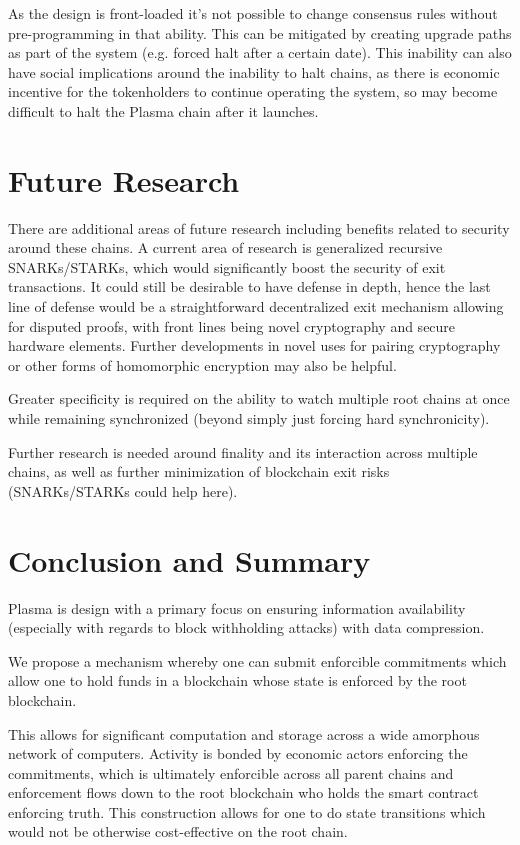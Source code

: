 \documentclass[letterpaper, 11pt]{article}
\begin{document}
As the design is front-loaded it's not possible to change consensus rules
without pre-programming in that ability. This can be mitigated by creating
upgrade paths as part of the system (e.g. forced halt after a certain date).
This inability can also have social implications around the inability to halt
chains, as there is economic incentive for the tokenholders to continue
operating the system, so may become difficult to halt the Plasma chain after it
launches.

\section{Future Research}

There are additional areas of future research including benefits related to
security around these chains. A current area of research is generalized
recursive SNARKs/STARKs, which would significantly boost the security of exit
transactions. It could still be desirable to have defense in depth, hence the
last line of defense would be a straightforward decentralized exit mechanism
allowing for disputed proofs, with front lines being novel cryptography and
secure hardware elements. Further developments in novel uses for pairing
cryptography or other forms of homomorphic encryption may also be helpful.

Greater specificity is required on the ability to watch multiple root chains at
once while remaining synchronized (beyond simply just forcing hard
synchronicity).

Further research is needed around finality and its interaction across multiple
chains, as well as further minimization of blockchain exit risks (SNARKs/STARKs
could help here).

\section{Conclusion and Summary}

Plasma is design with a primary focus on ensuring information availability
(especially with regards to block withholding attacks) with data compression.

We propose a mechanism whereby one can submit enforcible commitments which allow
one to hold funds in a blockchain whose state is enforced by the root
blockchain.

This allows for significant computation and storage across a wide amorphous
network of computers. Activity is bonded by economic actors enforcing the
commitments, which is ultimately enforcible across all parent chains and
enforcement flows down to the root blockchain who holds the smart contract
enforcing truth. This construction allows for one to do state transitions which
would not be otherwise cost-effective on the root chain.
\end{document}
